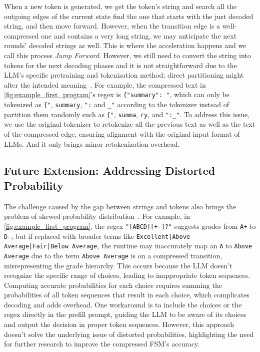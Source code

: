 When a new token is generated, we get the token's string and search all the outgoing edges of the current state find the one that starts with the just decoded string, and then move forward. However, when the transition edge is a well-compressed one and contains a very long string, we may anticipate the next rounds' decoded strings as well. This is where the acceleration happens and we call this process \textit{Jump Forward}. However, we still need to convert the string into tokens for the next decoding phases and it is not straightforward due to the LLM's specific pretraining and tokenization method; direct partitioning might alter the intended meaning~\cite{Tran-Thien_2024}. For example, the compressed text in \autoref{fig:example_first_program}'s regex is \texttt{\{"summary":\ "}, which can only be tokenized as \texttt{\{"}, \texttt{summary}, \texttt{":} and \texttt{\_"} according to the tokenizer instead of partition them randomly such as \texttt{\{"}, \texttt{summa}, \texttt{ry}, and \texttt{":\_"}. To address this issue, we use the original tokenizer to retokenize all the previous text as well as the text of the compressed edge, ensuring alignment with the original input format of LLMs. And it only brings minor retokenization overhead.

\subsection{Future Extension: Addressing Distorted Probability}

The challenge caused by the gap between strings and tokens also brings the problem of skewed probability distribution~\cite{Tran-Thien_2024}. For example, in \autoref{fig:example_first_program}, the regex \texttt{"[ABCD][+-]?"} suggests grades from \texttt{A+} to \texttt{D-}, but if replaced with broader terms like \texttt{Excellent|Above Average|Fair|Below Average}, the runtime may inaccurately map an \texttt{A} to \texttt{Above Average} due to the term \texttt{Above Average} is on a compressed transition, misrepresenting the grade hierarchy. This occurs because the LLM doesn't recognize the specific range of choices, leading to inappropriate token sequences. Computing accurate probabilities for each choice requires summing the probabilities of all token sequences that result in each choice, which complicates decoding and adds overhead. One workaround is to include the choices or the regex directly in the prefill prompt, guiding the LLM to be aware of its choices and output the decision in proper token sequences. However, this approach doesn't solve the underlying issue of distorted probabilities, highlighting the need for further research to improve the compressed FSM's accuracy.





